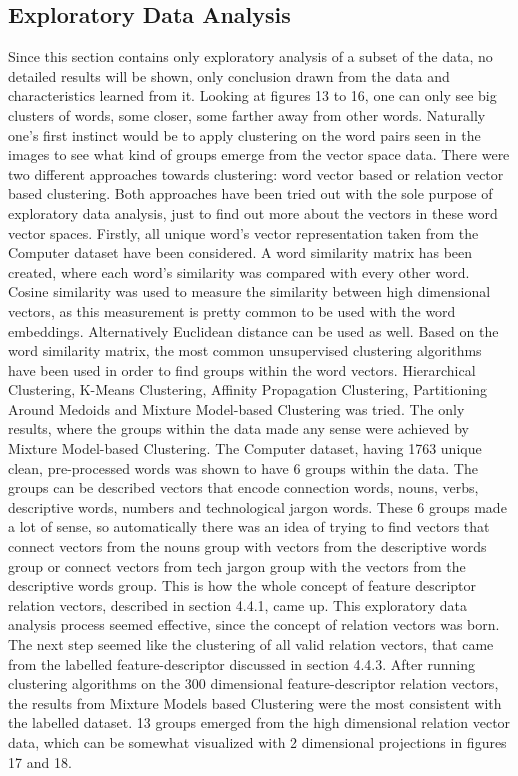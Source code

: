\documentclass{sig-alternate}
\begin{document}
\subsection{Exploratory Data Analysis}
Since this section contains only exploratory analysis of a subset of the data, no detailed results will be shown, only conclusion drawn from the data and characteristics learned from it.
Looking at figures 13 to 16, one can only see big clusters of words, some closer, some farther away from other words. Naturally one's first instinct would be to apply clustering on the word pairs seen in the images to see what kind of groups emerge from the vector space data.
There were two different approaches towards clustering: word vector based or relation vector based clustering. Both approaches have been tried out with the sole purpose of exploratory data analysis, just to find out more about the vectors in these word vector spaces. 
Firstly, all unique word's vector representation taken from the Computer dataset\cite{HuLiu2004} have been considered. A word similarity matrix has been created, where each word's similarity was compared with every other word. Cosine similarity was used to measure the similarity between high dimensional vectors, as this measurement is pretty common to be used with the word embeddings. Alternatively Euclidean distance can be used as well.
Based on the word similarity matrix, the most common unsupervised clustering algorithms have been used in order to find groups within the word vectors. Hierarchical Clustering, K-Means Clustering, Affinity Propagation Clustering, Partitioning Around Medoids and Mixture Model-based Clustering was tried. The only results, where the groups within the data made any sense were achieved by Mixture Model-based Clustering. The Computer dataset, having 1763 unique clean, pre-processed words was shown to have 6 groups within the data. The groups can be described vectors that encode connection words, nouns, verbs, descriptive words, numbers and technological jargon words. These 6 groups made a lot of sense, so automatically there was an idea of trying to find vectors that connect vectors from the nouns group with vectors from the descriptive words group or connect vectors from tech jargon group with the vectors from the descriptive words group. This is how the whole concept of feature descriptor relation vectors, described in section 4.4.1, came up. This exploratory data analysis process seemed effective, since the concept of relation vectors was born. The next step seemed like the clustering of all valid relation vectors, that came from the labelled feature-descriptor discussed in section 4.4.3. 
After running clustering algorithms on the 300 dimensional feature-descriptor relation vectors, the results from Mixture Models based Clustering were the most consistent with the labelled dataset. 13 groups emerged from the high dimensional relation vector data, which can be somewhat visualized with 2 dimensional projections in figures 17 and 18.
\end{document}
